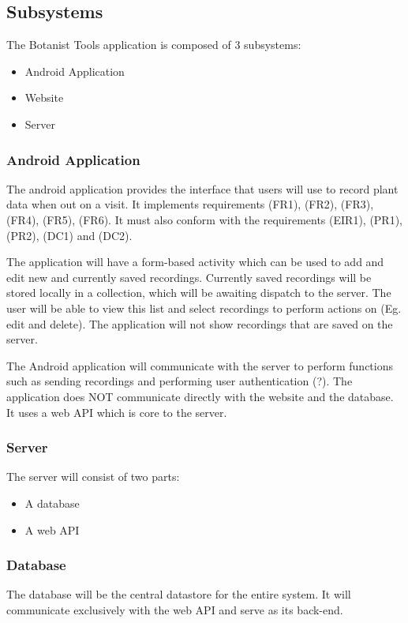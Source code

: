 \subsection{Subsystems}
	The Botanist Tools application is composed of 3 subsystems:
	\begin{itemize}
		\item Android Application
		\item Website
		\item Server
	\end{itemize}

	\subsubsection{Android Application}
		The android application provides the interface that users will use to record  plant data when out on a visit. It implements requirements (FR1), (FR2), (FR3), (FR4), (FR5), (FR6). It must also conform with the requirements (EIR1), (PR1),  (PR2), (DC1) and (DC2).

		The application will have a form-based activity which can be used to add and edit new and currently saved recordings. Currently saved recordings will be stored locally in a collection, which will be awaiting dispatch to the server. The user will be able to view this list and select recordings to perform actions on (Eg. edit and delete). The application will not show recordings that are saved on the server. 

		The Android application will communicate with the server to perform functions such as sending recordings and performing user authentication (?). The application does NOT communicate directly with the website and the database. It uses a web API which is core to the server.

	\subsubsection{Server}

		The server will consist of two parts: 
		\begin{itemize}
			\item A database
			\item A web API
		\end{itemize}

	\subsubsection{Database}
		The database will be the central datastore for the entire system. It will communicate exclusively with the web API and serve as its back-end. 

